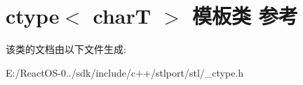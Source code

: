 \hypertarget{classctype}{}\section{ctype$<$ charT $>$ 模板类 参考}
\label{classctype}


该类的文档由以下文件生成\+:\begin{DoxyCompactItemize}
\item 
E\+:/\+React\+O\+S-\/0../sdk/include/c++/stlport/stl/\+\_\+ctype.\+h\end{DoxyCompactItemize}
